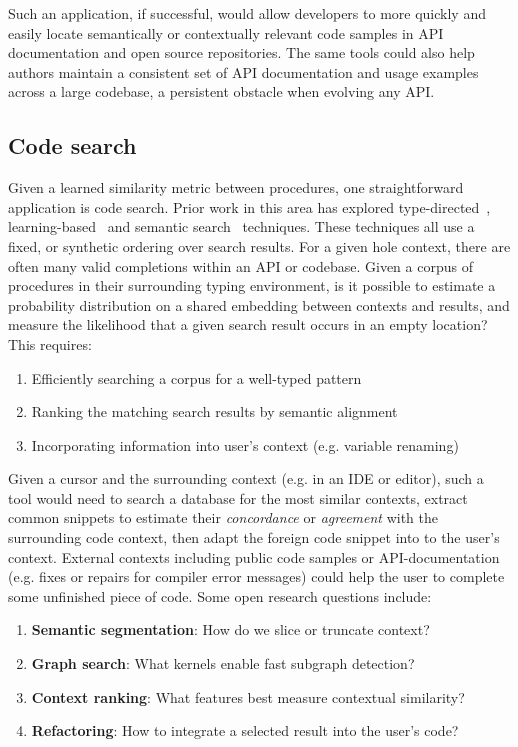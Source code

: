 \documentclass[10pt]{article}
\begin{document}
Such an application, if successful, would allow developers to more quickly and easily locate semantically or contextually relevant code samples in API documentation and open source repositories. The same tools could also help authors maintain a consistent set of API documentation and usage examples across a large codebase, a persistent obstacle when evolving any API.

  \pagebreak\subsection{Code search}\label{subsec:code-search}

  Given a learned similarity metric between procedures, one straightforward application is code search. Prior work in this area has explored type-directed~\cite{james2020digging}, learning-based~\cite{gu2018deep} and semantic search~\cite{premtoon2020semantic} techniques. These techniques all use a fixed, or synthetic ordering over search results. For a given hole context, there are often many valid completions within an API or codebase. Given a corpus of procedures in their surrounding typing environment, is it possible to estimate a probability distribution on a shared embedding between contexts and results, and measure the likelihood that a given search result occurs in an empty location? This requires:

  \begin{enumerate}
    \item Efficiently searching a corpus for a well-typed pattern
    \item Ranking the matching search results by semantic alignment
    \item Incorporating information into user's context (e.g. variable renaming)
  \end{enumerate}

  Given a cursor and the surrounding context (e.g. in an IDE or editor), such a tool would need to search a database for the most similar contexts, extract common snippets to estimate their \textit{concordance} or \textit{agreement} with the surrounding code context, then adapt the foreign code snippet into to the user's context. External contexts including public code samples or API-documentation (e.g. fixes or repairs for compiler error messages) could help the user to complete some unfinished piece of code. Some open research questions include:

  \begin{enumerate}
    \item \textbf{Semantic segmentation}: How do we slice or truncate context?
    \item \textbf{Graph search}: What kernels enable fast subgraph detection?
    \item \textbf{Context ranking}: What features best measure contextual similarity?
    \item \textbf{Refactoring}: How to integrate a selected result into the user's code?
  \end{enumerate}
\end{document}
